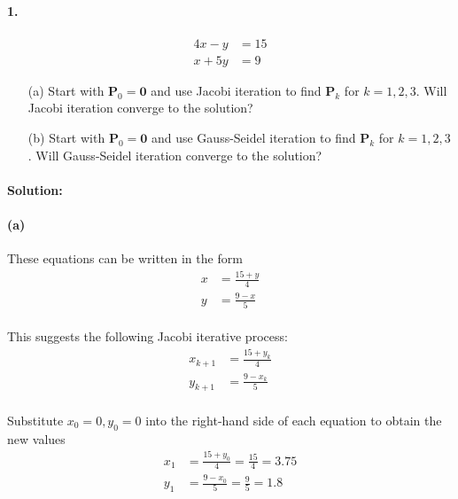 \documentclass{article}  %
\begin{document}
        \paragraph{1.}
        \begin{align*}
            4x - y &= 15 \\
            x + 5y &= 9
        \end{align*}
        \begin{enumerate}
            \item[(a)] 
            Start with $\bm{P}_0 = \bm{0}$ and use Jacobi iteration to find $\bm{P}_k$ for $k = 1, 2, 3$. Will Jacobi iteration converge to the solution?
            \item[(b)]
            Start with $\bm{P}_0 = \bm{0}$ and use Gauss-Seidel iteration to find $\bm{P}_k$ for $k = 1, 2, 3$. Will Gauss-Seidel iteration converge to the solution?
        \end{enumerate}
        \paragraph{Solution:}
        \paragraph{(a)}These equations can be written in the form
        \begin{align*}
            x &= \frac{15 + y}{4} \\
            y &= \frac{9 - x}{5}
        \end{align*}
        \paragraph{}This suggests the following Jacobi iterative process:
        \begin{align*}
            x_{k+1} &= \frac{15 + y_k}{4} \\
            y_{k+1} &= \frac{9 - x_k}{5}
        \end{align*}
        \paragraph{}Substitute $x_0 = 0, y_0 = 0$ into the right-hand side of each equation to obtain the new values
        \begin{align*}
            x_{1} &= \frac{15 + y_0}{4} = \frac{15}{4} = 3.75 \\
            y_{1} &= \frac{9 - x_0}{5} = \frac{9}{5} = 1.8
        \end{align*}
\end{document}
